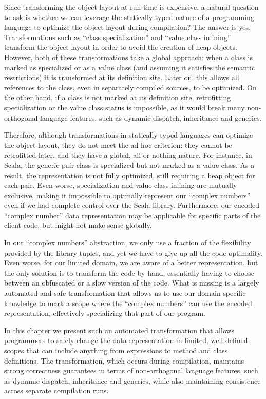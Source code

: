 Since transforming the object layout at run-time is expensive, a natural question to ask is whether we can leverage the statically-typed nature of a programming language to optimize the object layout during compilation? The answer is yes. Transformations such as ``class specialization'' and ``value class inlining'' transform the object layout in order to avoid the creation of heap objects. However, both
of these transformations take a global approach: when a class is marked as specialized or as a value class (and assuming it satisfies the semantic restrictions) it is transformed at its definition site. Later
on, this allows all references to the class, even in separately compiled sources, to be optimized. On the other hand, if a class is not marked at its definition site, retrofitting specialization or the value class status is impossible, as it would break many non-orthogonal language features, such as dynamic dispatch, inheritance and generics.

Therefore, although transformations in statically typed languages can optimize the object layout, they do not meet the ad hoc criterion: they cannot be retrofitted later, and they have a global, all-or-nothing
nature. For instance, in Scala, the generic pair class is specialized but not marked as a value class. As a result, the representation is not fully optimized, still requiring a heap object for each pair. Even
worse, specialization and value class inlining are mutually exclusive, making it impossible to optimally represent our ``complex numbers'' even if we had complete control over the Scala library. Furthermore, our encoded ``complex number'' data representation may be applicable for specific parts of the client code, but might not make sense globally.

In our ``complex numbers'' abstraction, we only use a fraction of the flexibility provided by the library tuples, and yet we have to give up all the code optimality. Even worse, for our limited domain, we are aware of a better representation, but the only solution is to transform the code by hand, essentially having to choose between an obfuscated or a slow version of the code. What is missing is a largely automated and safe transformation that allows us to use our domain-specific knowledge to mark a scope where the ``complex numbers'' can use the encoded representation, effectively specializing that part of our program.

In this chapter we present such an automated transformation that allows programmers to safely change the data representation in limited, well-defined scopes that can include anything from expressions to method and class definitions. The transformation, which occurs during compilation, maintains strong correctness guarantees in terms of non-orthogonal language features, such as dynamic dispatch, inheritance and generics, while also maintaining consistence across separate compilation runs.

